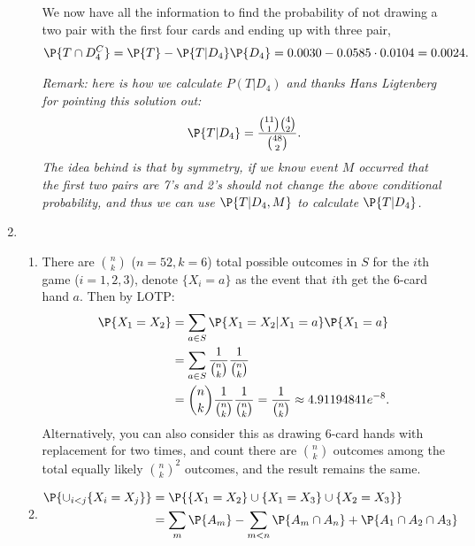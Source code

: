\begin{exercise}
\begin{solution}
\begin{enumerate}
\begin{enumerate}
			We now have all the information to find the probability of not drawing a two pair with the first four cards and ending up with three pair,
			\begin{align*}
				\P{T\cap D_{4}^{C}}=\P{T}-\P{T|D_{4}}\P{D_{4}}=0.0030 - 0.0585\cdot 0.0104 = 0.0024.
			\end{align*}
			
			\textit{Remark: here is how we calculate $P(T|D_{4})$
				and thanks Hans Ligtenberg for pointing this solution out:
				\begin{align*}
					\P{T|D_{4}} = \frac{{11\choose 1}{4 \choose 2} }{{48 \choose 2}}.
				\end{align*}
				The idea behind is that by symmetry, if we know event $M$ occurred that the first two pairs are 7's and 2's should not change the above conditional probability, and thus we can use $\P{T|D_{4},M}$ to calculate $\P{T|D_{4}}$.} 
			\end{enumerate}
		\item 
		\begin{enumerate}
			\item 			 There are $n \choose k$ ($n=52, k=6$) total possible outcomes in $S$ for the $i$th game ($i=1,2,3$), denote $\{X_i=a\}$ as the event that $i$th get the 6-card hand $a$. Then by LOTP:
			\begin{align*}
				\P{X_1=X_2} & = \sum_{a\in S} 	\P{X_1=X_2|X_1=a} \P{X_1=a} \\
				& = \sum_{a\in S} \frac{1}{{n \choose k} }\frac{1}{{n \choose k} } \\
				& = {n \choose k} \frac{1}{{n \choose k} }\frac{1}{{n \choose k} } = \frac{1}{{n \choose k} } \approx 4.91194841e^{-8}.
			\end{align*}
			Alternatively, you can also consider this as drawing 6-card hands with replacement for two times, and count there are $ {n \choose k}$ outcomes among the total equally likely $ {n \choose k}^2$ outcomes, and the result remains the same.
			\item 		\begin{align*}
				\P{\cup_{i<j} \{X_i=X_j\}} & = \P{\{X_1=X_2\}\cup\{X_1=X_3\} \cup \{X_2=X_3\} } \\
				& = \sum_{m} \P{A_m} -\sum_{m<n} \P{A_m\cap A_n} + \P{A_1\cap A_2\cap A_3} \\

\end{align*}
\end{enumerate}
\end{enumerate}
\end{solution}
\end{exercise}
